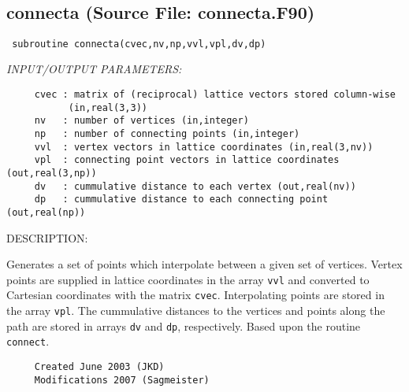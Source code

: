 \documentclass[11pt]{article}
\begin{document}

 
 
\mbox{}\hrulefill\ 
 
\subsection{connecta (Source File: connecta.F90)}


\begin{verbatim} subroutine connecta(cvec,nv,np,vvl,vpl,dv,dp)\end{verbatim}{\em INPUT/OUTPUT PARAMETERS:}
\begin{verbatim}     cvec : matrix of (reciprocal) lattice vectors stored column-wise
           (in,real(3,3))
     nv   : number of vertices (in,integer)
     np   : number of connecting points (in,integer)
     vvl  : vertex vectors in lattice coordinates (in,real(3,nv))
     vpl  : connecting point vectors in lattice coordinates (out,real(3,np))
     dv   : cummulative distance to each vertex (out,real(nv))
     dp   : cummulative distance to each connecting point (out,real(np))\end{verbatim}
{\sf DESCRIPTION:\\ }


     Generates a set of points which interpolate between a given set of vertices.
     Vertex points are supplied in lattice coordinates in the array {\tt vvl} and
     converted to Cartesian coordinates with the matrix {\tt cvec}. Interpolating
     points are stored in the array {\tt vpl}. The cummulative distances to the
     vertices and points along the path are stored in arrays {\tt dv} and
     {\tt dp}, respectively. Based upon the routine {\tt connect}.
  
\begin{verbatim}     Created June 2003 (JKD)
     Modifications 2007 (Sagmeister)\end{verbatim}







\end{document}
